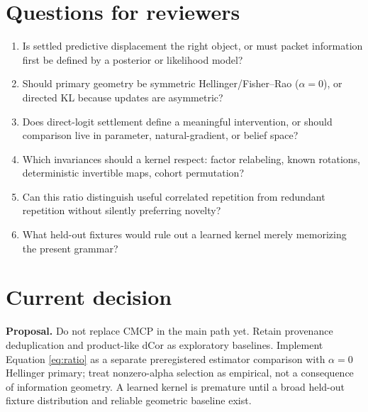 \documentclass[11pt]{article}
\newcommand{\proposal}{\textbf{Proposal.} }
\begin{document}
\section{Questions for reviewers}
\begin{enumerate}
\item Is settled predictive displacement the right object, or must packet information first be defined by a posterior or likelihood model?
\item Should primary geometry be symmetric Hellinger/Fisher--Rao ($\alpha=0$), or directed KL because updates are asymmetric?
\item Does direct-logit settlement define a meaningful intervention, or should comparison live in parameter, natural-gradient, or belief space?
\item Which invariances should a kernel respect: factor relabeling, known rotations, deterministic invertible maps, cohort permutation?
\item Can this ratio distinguish useful correlated repetition from redundant repetition without silently preferring novelty?
\item What held-out fixtures would rule out a learned kernel merely memorizing the present grammar?
\end{enumerate}

\section{Current decision}
\proposal Do not replace CMCP in the main path yet. Retain provenance deduplication and product-like dCor as exploratory baselines. Implement Equation \ref{eq:ratio} as a separate preregistered estimator comparison with $\alpha=0$ Hellinger primary; treat nonzero-alpha selection as empirical, not a consequence of information geometry. A learned kernel is premature until a broad held-out fixture distribution and reliable geometric baseline exist.
\end{document}

